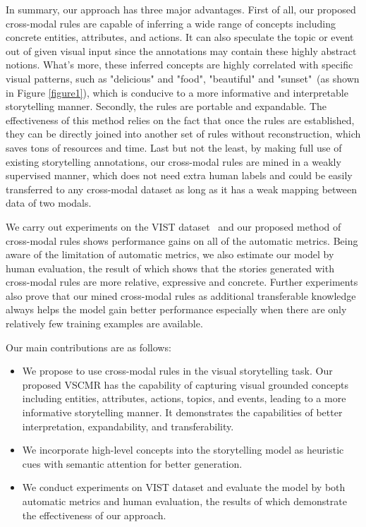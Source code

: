 \documentclass[sigconf]{acmart}
\begin{document}
In summary, our approach has three major advantages. 
    First of all, our proposed cross-modal rules are capable of inferring a wide range of concepts including concrete entities, attributes, and actions. It can also speculate the topic or event out of given visual input since the annotations may contain these highly abstract notions. What's more, these inferred concepts are highly correlated with specific visual patterns, such as "delicious" and "food", "beautiful" and "sunset"~(as shown in Figure \ref{figure1}), which is conducive to a more informative and interpretable storytelling manner.
        Secondly, the rules are portable and expandable. The effectiveness of this method relies on the fact that once the rules are established, they can be directly joined into another set of rules without reconstruction, which saves tons of resources and time. 
            Last but not the least, by making full use of existing storytelling annotations, our cross-modal rules are mined in a weakly supervised manner, which does not need extra human labels and could be easily transferred to any cross-modal dataset as long as it has a weak mapping between data of two modals.

We carry out experiments on the VIST dataset~\cite{huang2016visual} and our proposed method of cross-modal rules shows performance gains on all of the automatic metrics. Being aware of the limitation of automatic metrics, we also estimate our model by human evaluation, the result of which shows that the stories generated with cross-modal rules are more relative, expressive and concrete. Further experiments also prove that our mined cross-modal rules as additional transferable knowledge always helps the model gain better performance especially when there are only relatively few training examples are available. 

Our main contributions are as follows:
\begin{itemize}
    \item We propose to use cross-modal rules in the visual storytelling task. Our proposed VSCMR has the capability of capturing visual grounded concepts including entities, attributes, actions, topics, and events, leading to a more informative storytelling manner. It demonstrates the capabilities of better interpretation, expandability, and transferability. 
    \item We incorporate high-level concepts into the storytelling model as heuristic cues with semantic attention for better generation. 
    \item We conduct experiments on VIST dataset and evaluate the model by both automatic metrics and human evaluation, the results of which demonstrate the effectiveness of our approach.
\end{itemize}
\end{document}
